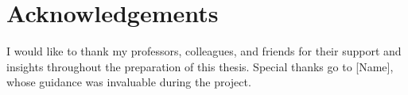 \clearpage
{}
\setcounter{page}{2}  %
\section*{Acknowledgements}

I would like to thank my professors, colleagues, and friends for their support and insights throughout the preparation of this thesis. Special thanks go to [Name], whose guidance was invaluable during the project.

\clearpage
